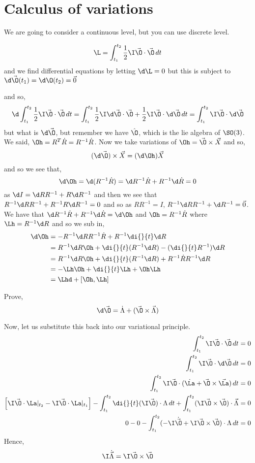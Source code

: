 
\section{Calculus of variations}
We are going to consider a continuous level, but you can use discrete level.
\begin{nthm}
  $$ \L = \int_{t_1}^{t_2} \frac{1}{2}\I\vec \O \cdot \vec\O \,dt $$
  and we find differential equations by letting $\d\L = 0$ but this is subject to $\d\vec\O(t_1) = \d\O(t_2) = \vec 0$
\end{nthm}
and so,
$$ \d\int_{t_1}^{t_2} \frac{1}{2}\I\vec\O \cdot \vec\O\, dt = \int_{t_1}^{t_2} \frac{1}{2}\I\d\vec\O \cdot \vec\O + \frac{1}{2}\I\vec\O \cdot \d\vec\O \, dt  = \int_{t_1}^{t_2}\I\vec\O \cdot \d\vec\O$$
but what is $\d\vec\O$, but remember we have $\hat\O$, which is the lie algebra of $\SO(3)$. We said, $\Oh = R^T\dot R = R^{-1}\dot R$. Now we take variations of $\Oh = \vec\O \times \vec X$ and so,
$$ (\d \vec \O)\times\vec X = (\d\Oh) \vec X $$
and so we see that,
$$ \d\Oh = \d(R^{-1}\dot R) = \d R^{-1}\dot R + R^{-1}\d\dot R = 0 $$
as $\d I = \d RR^{-1} + R\d R^{-1}$ and then we see that $R^{-1}\d R R^{-1} + R^{-1}R \d R^{-1} = 0$ and so as $RR^{-1} = I$, $R^{-1}\d RR^{-1} + \d R^{-1} = \vec 0$. We have that $\d R^{-1}\dot R + R^{-1}\d \dot R = \d \Oh$ and $\Oh = R^{-1}\dot R$ where $\Lh = R^{-1}\d R$ and so we sub in,
\begin{align*}
  \d\Oh &= -R^{-1}\d R R^{-1}\dot R + R^{-1}\di{}{t}\d R\\
  &= R^{-1}\d R \Oh + \di{}{t}(R^{-1}\d R) - (\di{}{t}R^{-1})\d R\\
  &= R^{-1}\d R \Oh + \di{}{t}(R^{-1}\d R) + R^{-1}\dot R R^{-1}\d R\\
  &= - \Lh\Oh + \di{}{t}\Lh + \Oh\Lh\\
  &=\Lhd + [\Oh, \Lh]
\end{align*}

\begin{exercise}
  Prove,
  $$ \d\vec\O = \dot\Lambda + (\vec\O \times \vec\Lambda) $$
\end{exercise}

Now, let us substitute this back into our variational principle.
\begin{align*}
  \int_{t_1}^{t_2} \I \vec\O \cdot \vec\O \,dt &= 0 \\
  \int_{t_1}^{t_2}\I \vec\O \cdot \d\vec\O \,dt &= 0 \\
  \int_{t_1}^{t_2} {\I \vec\O \cdot (\dot\La + \vec\O \times \vec\La)\,dt} &= 0\\
  \left[ \I\vec\O \cdot \La |_{t_2} - \I\vec\O \cdot \La |_{t_1} \right] - \int_{t_1}^{t_2} \di{}{t}(\I\vec\O) \cdot \Lambda\,dt + \int_{t_1}^{t_2} (\I\vec\O \times \vec\O)\cdot \vec\Lambda &= 0\\
  0 - 0 - \int_{t_1}^{t_2} (- \I\dot{\vec\O} + \I\vec\O \times \vec\O) \cdot \Lambda \, dt &= 0
\end{align*}
Hence,
$$ \I\dot{\vec \Lambda} = \I\vec\O \times \vec\O $$

